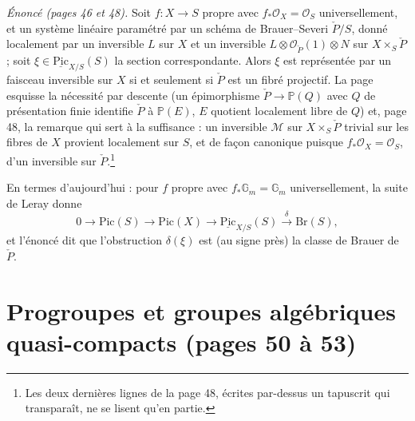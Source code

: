 \documentclass[11pt,a4paper]{article}
\begin{document}
\emph{Énoncé (pages 46 et 48).} Soit $f : X \to S$ propre avec $f_{*}\mathcal{O}_X =
\mathcal{O}_S$ universellement, et un système linéaire paramétré par un
schéma de Brauer–Severi $\check{P}/S$, donné localement par un inversible $L$
sur $X$ et un inversible $L \otimes \mathcal{O}_{\check{P}}(1) \otimes N$ sur $X
\times_S \check{P}$ ; soit $\xi \in \underline{\mathrm{Pic}}_{X/S}(S)$ la
section correspondante. Alors $\xi$ est représentée par un faisceau
inversible sur $X$ si et seulement si $\check{P}$ est un fibré projectif. La
page esquisse la nécessité par descente (un épimorphisme $\check{P} \to
\mathbb{P}(Q)$ avec $Q$ de présentation finie identifie $\check{P}$ à
$\mathbb{P}(E)$, $E$ quotient localement libre de $Q$) et, page 48, la
remarque qui sert à la suffisance : un inversible $\mathcal{M}$ sur $X
\times_S \check{P}$ trivial sur les fibres de $X$ provient localement sur $S$,
et de façon canonique puisque $f_{*}\mathcal{O}_X = \mathcal{O}_S$, d'un
inversible sur $\check{P}$.\footnote{Les deux dernières lignes de la page 48,
écrites par-dessus un tapuscrit qui transparaît, ne se lisent qu'en partie.}

En termes d'aujourd'hui : pour $f$ propre avec $f_{*}\mathbb{G}_m = \mathbb{G}_m$
universellement, la suite de Leray donne
\[
0 \to \mathrm{Pic}(S) \to \mathrm{Pic}(X) \to \underline{\mathrm{Pic}}_{X/S}(S)
\xrightarrow{\ \delta\ } \mathrm{Br}(S),
\]
et l'énoncé dit que l'obstruction $\delta(\xi)$ est (au signe près) la classe
de Brauer de $\check{P}$.

\section*{Progroupes et groupes algébriques quasi-compacts (pages 50 à 53)}
\end{document}
